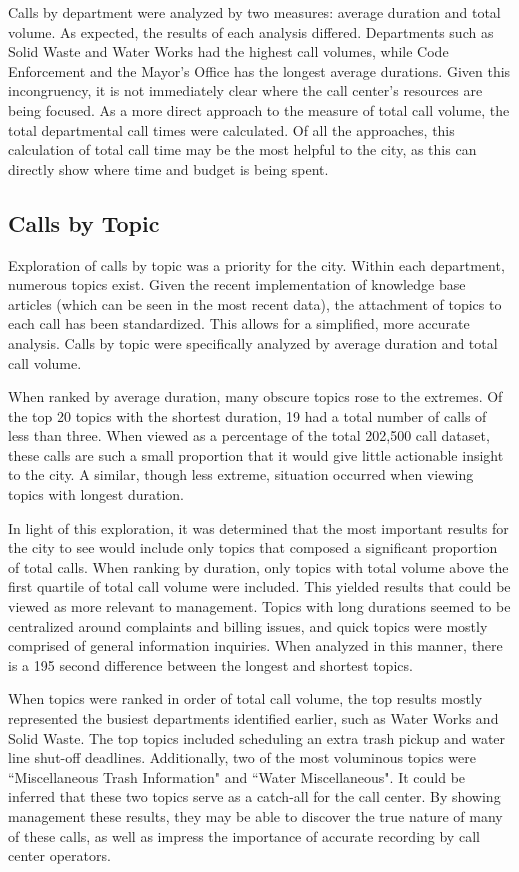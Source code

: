 \documentclass{article}
\begin{document}
Calls by department were analyzed by two measures:  average duration and total volume.  As expected, the results of each analysis differed.  Departments such as Solid Waste and Water Works had the highest call volumes, while Code Enforcement and the Mayor's Office has the longest average durations.  Given this incongruency, it is not immediately clear where the call center's resources are being focused.  As a more direct approach to the measure of total call volume, the total departmental call times were calculated.  Of all the approaches, this calculation of total call time may be the most helpful to the city, as this can directly show where time and budget is being spent.


	\subsection{Calls by Topic}

Exploration of calls by topic was a priority for the city.  Within each department, numerous topics exist.  Given the recent implementation of knowledge base articles (which can be seen in the most recent data), the attachment of topics to each call has been standardized.  This allows for a simplified, more accurate analysis.  Calls by topic were specifically analyzed by average duration and total call volume.
\par
When ranked by average duration, many obscure topics rose to the extremes.  Of the top 20 topics with the shortest duration, 19 had a total number of calls of less than three.  When viewed as a percentage of the total 202,500 call dataset, these calls are such a small proportion that it would give little actionable insight to the city.  A similar, though less extreme, situation occurred when viewing topics with longest duration.
\par
In light of this exploration, it was determined that the most important results for the city to see would include only topics that composed a significant proportion of total calls.  When ranking by duration, only topics with total volume above the first quartile of total call volume were included.  This yielded results that could be viewed as more relevant to management.  Topics with long durations seemed to be centralized around complaints and billing issues, and quick topics were mostly comprised of general information inquiries.  When analyzed in this manner, there is a 195 second difference between the longest and shortest topics.
\par
When topics were ranked in order of total call volume, the top results mostly represented the busiest departments identified earlier, such as Water Works and Solid Waste. The top topics included scheduling an extra trash pickup and water line shut-off deadlines.  Additionally, two of the most voluminous topics were ``Miscellaneous Trash Information" and ``Water Miscellaneous".  It could be inferred that these two topics serve as a catch-all for the call center.  By showing management these results, they may be able to discover the true nature of many of these calls, as well as impress the importance of accurate recording by call center operators.
\end{document}
